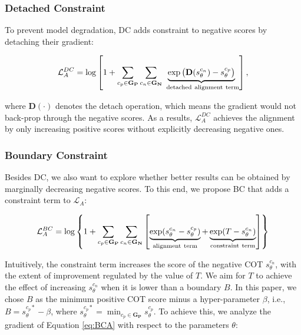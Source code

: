 \subsubsection{Detached Constraint} To prevent model degradation, DC adds constraint to negative scores by detaching their gradient:

\begin{equation}
    \mathcal{L}^{DC}_A = \log\left[1 + \sum_{c_p \in \mathbf{G_P}}\sum_{c_n \in \mathbf{G_N}} \underbrace{\exp\left(\mathbf{D}(s_{\theta}^{c_n}) - s_{\theta}^{c_p}\right)}_{\rm \ detached \ alignment \ term}\right],
    \label{eq:dcc}
\end{equation}

where $\mathbf{D}(\cdot)$ denotes the detach operation, which means the gradient would not back-prop through the negative scores. As a results, $\mathcal{L}^{DC}_A$ achieves the alignment by only increasing positive scores without explicitly decreasing negative ones. 

\subsubsection{Boundary Constraint} Besides DC, we also want to explore whether better results can be obtained by marginally decreasing negative scores. To this end, we propose BC that adds a constraint term to $\mathcal{L}_A$:

\begin{equation}
    \mathcal{L}_A^{BC} = \log\left\{1 + \sum_{c_p \in \mathbf{G_P}}\sum_{c_n \in \mathbf{G_N}} \left[\underbrace{\exp(s_{\theta}^{c_n} - s_{\theta}^{c_p})}_{\rm alignment \ term} +
 \underbrace{\exp(T - s_{\theta}^{c_n})}_{\rm constraint \ term}\right]\right\}
    \label{eq:BCA}
\end{equation}

Intuitively, the constraint term increases the score of the negative COT $s_{\theta}^{c_n}$, with the extent of improvement regulated by the value of $T$. We aim for $T$ to achieve the effect of increasing $s_{\theta}^{c_n}$ when it is lower than a boundary $B$. In this paper, we chose $B$ as the minimum positive COT score minus a hyper-parameter $\beta$, i.e., $B = s_{\theta}^{c_p*} - \beta$, where $ s_{\theta}^{c_p*}  = \min_{c_p \in \mathbf{G_P}}s_{\theta}^{c_p}$.
To achieve this, we analyze the gradient of Equation \ref{eq:BCA} with respect to the parameters $\theta$:

